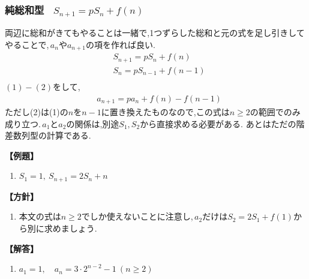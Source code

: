   \subsubsection{純総和型 \, $S_{n+1}=pS_n+f(n) $}
    両辺に総和がきてもやることは一緒で,1つずらした総和と元の式を足し引きしてやることで,\,$a_n$や$a_{n+1}$の項を作れば良い.
    \begin{align*}
      &S_{n+1}=pS_n+f(n) \tag*{\(\cdots\) (1)}\\
      &S_{n}=pS_{n-1}+f(n-1) \tag*{\(\cdots\) (2)}\\
    \end{align*}
      $(1)-(2)$をして,
    \begin{align*}
      &a_{n+1}=pa_{n}+f(n)-f(n-1)
    \end{align*}
    ただし(2)は(1)の$n$を$n-1$に置き換えたものなので,この式は$n\ge2$の範囲でのみ成り立つ.\,$a_1$と$a_2$の関係は,別途$S_1,S_2$から直接求める必要がある.
    あとはただの階差数列型の計算である.

    \noindent \textbf{【例題】}
    \begin{enumerate}[label=(\arabic*),parsep=3pt]
      \item $\displaystyle S_1=1,\ S_{n+1}=2S_n+n$
    \end{enumerate}

    \noindent\textbf{【方針】}
    \begin{enumerate}[label=(\arabic*),parsep=3pt]
      \item 本文の式は$n\ge2$でしか使えないことに注意し,\,$a_2$だけは$S_2=2S_1+f(1)$から別に求めましょう.
    \end{enumerate}

    \noindent\textbf{【解答】}
    \begin{enumerate}[label=(\arabic*),parsep=3pt]
      \item $\displaystyle a_1=1,\quad a_n=3\cdot2^{n-2}-1\ (n\ge2)$
    \end{enumerate}

